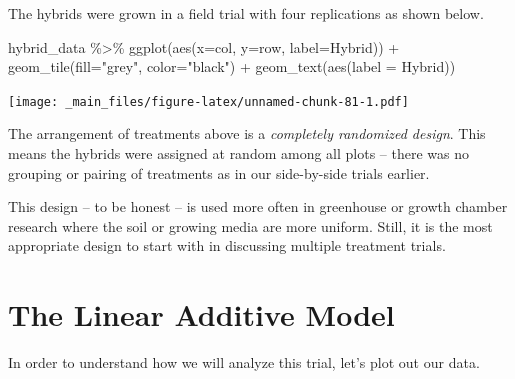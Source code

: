 \documentclass[
]{book}
\newenvironment{Shaded}{\begin{snugshade}}{\end{snugshade}}
\newcommand{\AttributeTok}[1]{\textcolor[rgb]{0.77,0.63,0.00}{#1}}
\newcommand{\FunctionTok}[1]{\textcolor[rgb]{0.00,0.00,0.00}{#1}}
\newcommand{\NormalTok}[1]{#1}
\newcommand{\SpecialCharTok}[1]{\textcolor[rgb]{0.00,0.00,0.00}{#1}}
\newcommand{\StringTok}[1]{\textcolor[rgb]{0.31,0.60,0.02}{#1}}
\begin{document}
The hybrids were grown in a field trial with four replications as shown below.

\begin{Shaded}
\begin{Highlighting}[]
\NormalTok{hybrid\_data }\SpecialCharTok{\%\textgreater{}\%}
  \FunctionTok{ggplot}\NormalTok{(}\FunctionTok{aes}\NormalTok{(}\AttributeTok{x=}\NormalTok{col, }\AttributeTok{y=}\NormalTok{row, }\AttributeTok{label=}\NormalTok{Hybrid)) }\SpecialCharTok{+}
  \FunctionTok{geom\_tile}\NormalTok{(}\AttributeTok{fill=}\StringTok{"grey"}\NormalTok{, }\AttributeTok{color=}\StringTok{"black"}\NormalTok{) }\SpecialCharTok{+}
  \FunctionTok{geom\_text}\NormalTok{(}\FunctionTok{aes}\NormalTok{(}\AttributeTok{label =}\NormalTok{ Hybrid))}
\end{Highlighting}
\end{Shaded}

\texttt{[image: \_main\_files/figure-latex/unnamed-chunk-81-1.pdf]}

The arrangement of treatments above is a \emph{completely randomized design}. This means the hybrids were assigned at random among all plots -- there was no grouping or pairing of treatments as in our side-by-side trials earlier.

This design -- to be honest -- is used more often in greenhouse or growth chamber research where the soil or growing media are more uniform. Still, it is the most appropriate design to start with in discussing multiple treatment trials.

\hypertarget{the-linear-additive-model}{%
\section{The Linear Additive Model}\label{the-linear-additive-model}}

In order to understand how we will analyze this trial, let's plot out our data.
\end{document}

